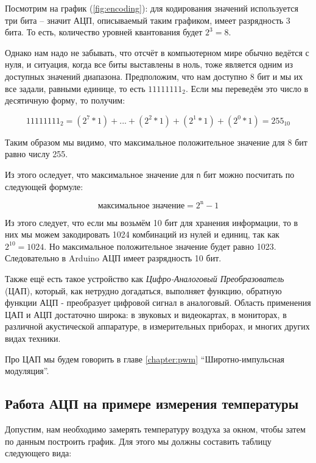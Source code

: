 \documentclass[../sparc.tex]{subfiles}
\begin{document}
Посмотрим на график (\ref{fig:encoding}): для кодирования значений используется
три бита -- значит АЦП, описываемый таким графиком, имеет разрядность 3 бита.  То
есть, количество уровней квантования будет $2^3 = 8$.

Однако нам надо не забывать, что отсчёт в компьютерном мире обычно ведётся с
нуля, и ситуация, когда все биты выставлены в ноль, тоже является одним из
доступных значений диапазона.  Предположим, что нам доступно 8 бит и мы их все
задали, равными единице, то есть $11111111_2$.  Если мы переведём это число в
десятичную форму, то получим:

\begin{equation}
  11111111_2 = (2^7 * 1) + \mbox{...} + (2^2 * 1) + (2^1 * 1) + (2^0 * 1) = 255_{10}
\end{equation}

Таким образом мы видимо, что максимальное положительное значение для 8 бит равно
числу 255.

Из этого оследует, что максимальное значение для \texttt{n} бит можно посчитать
по следующей формуле:

\begin{equation}
  \mbox{максимальное значение} = 2^{\mbox{n}} - 1
\end{equation}

Из этого следует, что если мы возьмём 10 бит для хранения информации, то в них
мы можем закодировать 1024 комбинаций из нулей и единиц, так как $2^{10} =
1024$.  Но максимальное положительное значение будет равно 1023.  Следовательно
в Arduino АЦП имеет разрядность 10 бит.

Также ещё есть такое устройство как \emph{Цифро-Аналоговый Преобразователь}
(\gls{ЦАП}), который, как нетрудно догадаться, выполняет функцию, обратную
функции АЦП - преобразует цифровой сигнал в аналоговый.  Область применения ЦАП
и АЦП достаточно широка: в звуковых и видеокартах, в мониторах, в различной
акустической аппаратуре, в измерительных приборах, и многих других видах
техники.

Про ЦАП мы будем говорить в главе \ref{chapter:pwm} ``Широтно-импульсная
модуляция''.

\subsection{Работа АЦП на примере измерения температуры}
\label{subsection:adc-temperature-example}

Допустим, нам необходимо замерять температуру воздуха за окном, чтобы затем по
данным построить график.  Для этого мы должны составить таблицу следующего вида:
\end{document}
